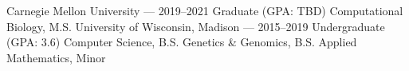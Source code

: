 \documentclass[10pt, letterpaper]{awesome-cv}
\newcommand{\col}{awesome-red}
\newcommand{\regcol}{\textcolor{\col}}
\begin{document}
\makecvheader
\vspace*{-4mm}
\begin{minipage}[t]{0.5\textwidth}
    \cvgrad
        {Carnegie Mellon University \scriptsize --- 2019--2021}
        {\regcol{Graduate (GPA: TBD)}}
        {Computational Biology, M.S.}
    \cvundergrad
        {University of Wisconsin, Madison \scriptsize --- 2015--2019}
        {\regcol{Undergraduate (GPA: 3.6)}}
        {Computer Science, B.S.}
        {Genetics \& Genomics, B.S.}
        {Applied Mathematics, Minor}
\end{minipage}
\end{document}
